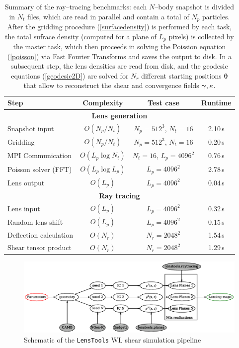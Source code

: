 \documentclass[reprint,aps,prd,superscriptaddress,showkeys,showpacs]{revtex4-1}
\newcommand{\LT}{\texttt{LensTools} }
\begin{document}
\begin{table}
\begin{tabular}{l|c|c|c}
\toprule
{Step} &            Complexity &            Test case &           Runtime \\ \hline \hline
\midrule
\multicolumn{4}{c}{\textbf{Lens generation}} \\ \hline
Snapshot input & $O(N_p/N_t)$  & $N_p=512^3$, $N_t=16$  & 2.10\,s  \\
Gridding        & $O(N_p/N_t)$   & $N_p=512^3$, $N_t=16$  & 0.20\,s \\
MPI Communication  & $O(L_p\log{N_t})$   & $N_t=16$, $L_p=4096^2$  & 0.76\,s   \\
Poisson solver (FFT)           & $O(L_p\log{L_p})$ & $L_p=4096^2$  &  2.78\,s    \\
Lens output           & $O(L_p)$ & $L_p=4096^2$   & 0.04\,s  \\ \hline \hline

\multicolumn{4}{c}{\textbf{Ray tracing}} \\ \hline
Lens input &  $O(L_p)$ & $L_p=4096^2$ & 0.32\,s \\
Random lens shift &  $O(L_p)$ & $L_p=4096^2$ & 0.15\,s \\
Deflection calculation        &  $O(N_r)$ & $N_r=2048^2$   & 1.54\,s  \\
Shear tensor product               &  $O(N_r)$ & $N_r=2048^2$   &  1.29\,s \\ \hline \hline

\bottomrule
\end{tabular}
\caption{Summary of the ray--tracing benchmarks: each $N$--body snapshot is divided in $N_t$ files, which are read in parallel and contain a total of $N_p$ particles. After the gridding procedure (\ref{surfacedensity}) is performed by each task, the total sufrace density (computed for a plane of $L_p$ pixels) is collected by the master task, which then proceeds in solving the Poission equation (\ref{poisson}) via Fast Fourier Transforms and saves the output to disk. In a subsequent step, the lens densities are read from disk, and the geodesic equations (\ref{geodesic2D}) are solved for $N_r$ different starting positions $\pmb{\theta}$ that allow to reconstruct the shear and convergence fields $\pmb{\gamma},\kappa$.}
\label{benchmarktable}
\end{table}

\begin{figure}
\includegraphics[scale=0.6]{Figures/flow.eps}
\caption{Schematic of the \LT WL shear simulation pipeline}
\label{pipescheme}
\end{figure}
\end{document}

